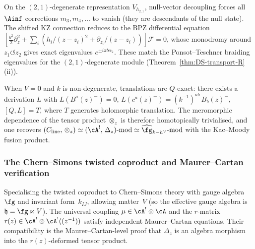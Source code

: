 \begin{remark}
\label{rem:virasoro-degenerate-truncation}
On the $(2,1)$-degenerate representation $V_{h_{2,1}}$,
null-vector decoupling forces all $\Ainf$ corrections
$m_3, m_4, \ldots$ to vanish (they are descendants of the null state).
The shifted KZ connection reduces to the BPZ differential equation
$[\frac{b^2}{2}\partial_z^2 + \sum_i(h_i/(z-z_i)^2 +
\partial_{z_i}/(z-z_i))]\mathcal{F} = 0$,
whose monodromy around $z_1 \circlearrowleft z_2$ gives exact
eigenvalues $e^{\pm i\pi b\alpha_2}$. These match the
Ponsot--Teschner braiding eigenvalues for the $(2,1)$-degenerate
module (Theorem~\ref{thm:DS-transport-R}(ii)).
\end{remark}

\begin{remark}
\label{rem:pure-cs-simplification}
When $V = 0$ and $k$ is non-degenerate, translations are
$Q$-exact: there exists a derivation $L$ with
$L(B^a(z)^-) = 0$,
$L(c^a(z)^-) = (k^{-1})^{ab}\, B_b(z)^-$,
$[Q, L] = T$,
where $T$ generates holomorphic translation.
The meromorphic dependence of the tensor product
$\otimes_z$ is therefore homotopically trivialised, and one
recovers
$(C_{\mathrm{line}},\, \otimes_z)
\simeq (\cA^!,\, \Delta_z)\text{-}\mathrm{mod}
\simeq \widehat{\fg}_{k - h^\vee}\text{-}\mathrm{mod}$
with the Kac--Moody fusion product.
\end{remark}

\subsubsection{The Chern--Simons twisted coproduct and Maurer--Cartan verification}
\label{subsubsec:cs-twisted-coproduct}

Specialising the twisted coproduct to Chern--Simons theory
with gauge algebra~$\fg$ and invariant form~$k_{IJ}$, allowing
matter~$V$ (so the effective gauge algebra is
$\mathfrak{h} = \fg \ltimes V$). The universal coupling
$\mu \in \cA^! \otimes \cA$ and the $r$-matrix
$r(z) \in \cA^! \otimes \cA^!((z^{-1}))$ satisfy independent
Maurer--Cartan equations. Their compatibility is the
Maurer--Cartan-level proof that $\Delta_z$ is an algebra morphism
into the $r(z)$-deformed tensor product.

